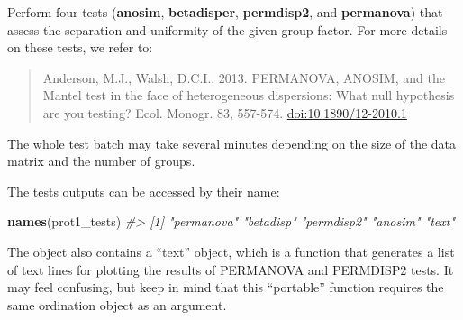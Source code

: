 \documentclass[12pt,]{book}
\newenvironment{Shaded}{\begin{snugshade}}{\end{snugshade}}
\newcommand{\CommentTok}[1]{\textcolor[rgb]{0.56,0.35,0.01}{\textit{#1}}}
\newcommand{\KeywordTok}[1]{\textcolor[rgb]{0.13,0.29,0.53}{\textbf{#1}}}
\newcommand{\NormalTok}[1]{#1}
\newcommand{\OperatorTok}[1]{\textcolor[rgb]{0.81,0.36,0.00}{\textbf{#1}}}
\newcommand{\StringTok}[1]{\textcolor[rgb]{0.31,0.60,0.02}{#1}}
\begin{document}
Perform four tests (\textbf{anosim}, \textbf{betadisper}, \textbf{permdisp2}, and \textbf{permanova}) that assess the separation and uniformity of the given group factor. For more details on these tests, we refer to:

\begin{quote}
Anderson, M.J., Walsh, D.C.I., 2013. PERMANOVA, ANOSIM, and the Mantel test in the face of heterogeneous dispersions: What null hypothesis are you testing? Ecol. Monogr. 83, 557-574. \url{doi:10.1890/12-2010.1}
\end{quote}

The whole test batch may take several minutes depending on the size of the data matrix and the number of groups.

\begin{Shaded}
\end{Shaded}

The tests outputs can be accessed by their name:

\begin{Shaded}
\begin{Highlighting}[]
\KeywordTok{names}\NormalTok{(prot1_tests)}
\CommentTok{#> [1] "permanova" "betadisp"  "permdisp2" "anosim"    "text"}
\end{Highlighting}
\end{Shaded}

The object also contains a ``text'' object, which is a function that generates a list of text lines for plotting the results of PERMANOVA and PERMDISP2 tests. It may feel confusing, but keep in mind that this ``portable'' function requires the same ordination object as an argument.
\end{document}
